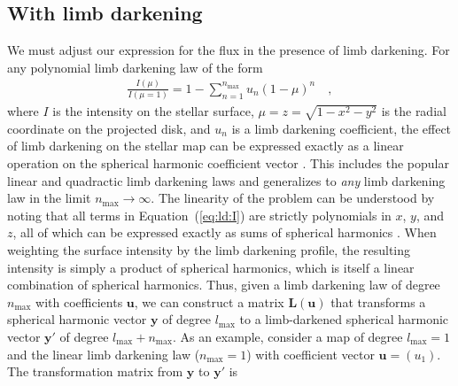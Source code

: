 \documentclass[modern]{aastex62}
\begin{document}
\subsection{With limb darkening}
%
\label{sec:ld}
We must adjust our expression for the flux in the presence of limb darkening.
For any polynomial limb darkening law of the form
%
\begin{align}
    \label{eq:ld:I}
    \frac{I(\mu)}{I(\mu = 1)} = 1 - \sum_{n=1}^{n_\mathrm{max}} u_n(1 - \mu)^n
    \quad,
\end{align}
%
where $I$ is the intensity on the stellar surface,
$\mu = z = \sqrt{1 - x^2 - y^2}$ is the radial coordinate on the
projected disk, and $u_n$ is a limb darkening coefficient, the effect of
limb darkening on the stellar map can be expressed exactly as a linear
operation on the spherical harmonic coefficient vector
\citep{Luger2019}.
This includes the popular linear and quadractic limb darkening laws
and generalizes to \emph{any} limb darkening law in the limit
$n_\mathrm{max} \rightarrow \infty$. The linearity of the problem
can be understood by noting that all terms
in Equation~(\ref{eq:ld:I}) are strictly polynomials in $x$, $y$, and $z$,
all of which can be expressed exactly as sums of spherical harmonics
\citep{Luger2019}. When weighting the surface intensity by the limb darkening
profile, the resulting intensity is simply a product of spherical harmonics,
which is itself a linear combination of spherical harmonics.
Thus, given a limb darkening law
of degree $n_\mathrm{max}$ with coefficients $\mathbf{u}$,
we can construct a matrix $\mathbf{L}(\mathbf{u})$
that transforms a spherical harmonic vector $\mathbf{y}$ of degree
$l_\mathrm{max}$ to a limb-darkened spherical harmonic vector $\mathbf{y'}$
of degree $l_\mathrm{max} + n_\mathrm{max}$. As an example, consider
a map of degree $l_\mathrm{max} = 1$ and the linear limb darkening law
($n_\mathrm{max} = 1$) with coefficient vector $\mathbf{u} = ( u_1 )$.
The transformation matrix from $\mathbf{y}$ to $\mathbf{y'}$ is
%
\end{document}
